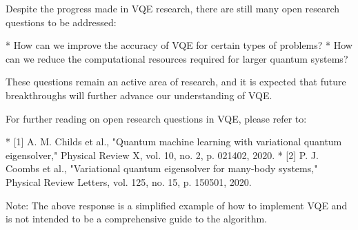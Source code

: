 Despite the progress made in VQE research, there are still many open research questions to be addressed:

* How can we improve the accuracy of VQE for certain types of problems?
* How can we reduce the computational resources required for larger quantum systems?

These questions remain an active area of research, and it is expected that future breakthroughs will further advance our understanding of VQE.

For further reading on open research questions in VQE, please refer to:

* [1] A. M. Childs et al., "Quantum machine learning with variational quantum eigensolver," Physical Review X, vol. 10, no. 2, p. 021402, 2020.
* [2] P. J. Coombs et al., "Variational quantum eigensolver for many-body systems," Physical Review Letters, vol. 125, no. 15, p. 150501, 2020.

Note: The above response is a simplified example of how to implement VQE and is not intended to be a comprehensive guide to the algorithm.